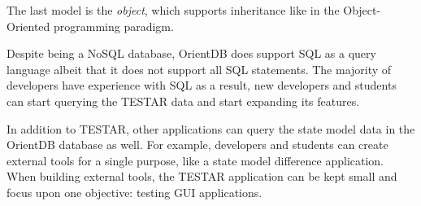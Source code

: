 The last model is the \hypertarget{db:object}{\emph{object}}, which supports inheritance like in the Object-Oriented programming paradigm.\par

Despite being a NoSQL database, OrientDB does support SQL as a query language \cite{sql-lang} albeit that it does not support all SQL statements. The majority of developers have experience with SQL \cite{sql-stats} as a result, new developers and students can start querying the TESTAR data and start expanding its features.\par

In addition to TESTAR, other applications can query the state model data in the OrientDB database as well. For example, developers and students can create external tools for a single purpose, like a state model difference application. When building external tools, the TESTAR application can be kept small and focus upon one objective: testing GUI applications. 